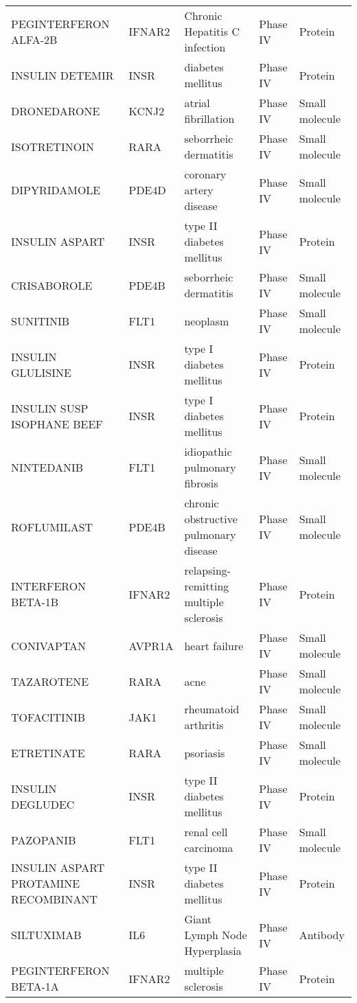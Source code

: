 \documentclass[fleqn,10pt]{SelfArx} %
\begin{document}
\begin{table}[ht]
\begin{tabularx}{\textwidth}{lXlll}
		PEGINTERFERON ALFA-2B & IFNAR2 & Chronic Hepatitis C infection & Phase IV & Protein \\ 
		INSULIN DETEMIR & INSR & diabetes mellitus & Phase IV & Protein \\ 
		DRONEDARONE & KCNJ2 & atrial fibrillation & Phase IV & Small molecule \\ 
		ISOTRETINOIN & RARA & seborrheic dermatitis & Phase IV & Small molecule \\ 
		DIPYRIDAMOLE & PDE4D & coronary artery disease & Phase IV & Small molecule \\ 
		INSULIN ASPART & INSR & type II diabetes mellitus & Phase IV & Protein \\ 
		CRISABOROLE & PDE4B & seborrheic dermatitis & Phase IV & Small molecule \\ 
		SUNITINIB & FLT1 & neoplasm & Phase IV & Small molecule \\ 
		INSULIN GLULISINE & INSR & type I diabetes mellitus & Phase IV & Protein \\ 
		INSULIN SUSP ISOPHANE BEEF & INSR & type I diabetes mellitus & Phase IV & Protein \\ 
		NINTEDANIB & FLT1 & idiopathic pulmonary fibrosis & Phase IV & Small molecule \\ 
		ROFLUMILAST & PDE4B & chronic obstructive pulmonary disease & Phase IV & Small molecule \\ 
		INTERFERON BETA-1B & IFNAR2 & relapsing-remitting multiple sclerosis & Phase IV & Protein \\ 
		CONIVAPTAN & AVPR1A & heart failure & Phase IV & Small molecule \\ 
		TAZAROTENE & RARA & acne & Phase IV & Small molecule \\ 
		TOFACITINIB & JAK1 & rheumatoid arthritis & Phase IV & Small molecule \\ 
		ETRETINATE & RARA & psoriasis & Phase IV & Small molecule \\ 
		INSULIN DEGLUDEC & INSR & type II diabetes mellitus & Phase IV & Protein \\ 
		PAZOPANIB & FLT1 & renal cell carcinoma & Phase IV & Small molecule \\ 
		INSULIN ASPART PROTAMINE RECOMBINANT & INSR & type II diabetes mellitus & Phase IV & Protein \\ 
		SILTUXIMAB & IL6 & Giant Lymph Node Hyperplasia & Phase IV & Antibody \\ 
		PEGINTERFERON BETA-1A & IFNAR2 & multiple sclerosis & Phase IV & Protein \\ 

\end{tabularx}
\end{table}
\end{document}
